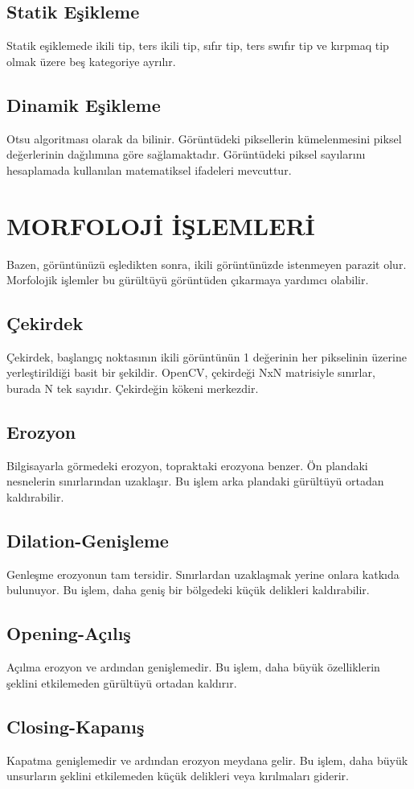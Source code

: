 \subsection{Statik Eşikleme}
Statik eşiklemede ikili tip, ters ikili tip, sıfır tip, ters swıfır tip ve kırpmaq tip olmak üzere beş kategoriye ayrılır.
\subsection{Dinamik Eşikleme}
Otsu algoritması olarak da bilinir. Görüntüdeki piksellerin kümelenmesini piksel değerlerinin dağılımına göre sağlamaktadır. Görüntüdeki piksel sayılarını hesaplamada kullanılan matematiksel ifadeleri mevcuttur.

 \section{MORFOLOJİ İŞLEMLERİ}
\cite{image_proc} Bazen, görüntünüzü eşledikten sonra, ikili görüntünüzde istenmeyen parazit olur. Morfolojik işlemler bu gürültüyü görüntüden çıkarmaya yardımcı olabilir.
\subsection{Çekirdek}
Çekirdek, başlangıç noktasının ikili görüntünün 1 değerinin her pikselinin üzerine yerleştirildiği basit bir şekildir. OpenCV, çekirdeği NxN matrisiyle sınırlar, burada N tek sayıdır. Çekirdeğin kökeni merkezdir.
\subsection{Erozyon}
Bilgisayarla görmedeki erozyon, topraktaki erozyona benzer. Ön plandaki nesnelerin sınırlarından uzaklaşır. Bu işlem arka plandaki gürültüyü ortadan kaldırabilir.
\subsection{Dilation-Genişleme}
Genleşme erozyonun tam tersidir. Sınırlardan uzaklaşmak yerine onlara katkıda bulunuyor. Bu işlem, daha geniş bir bölgedeki küçük delikleri kaldırabilir.
\subsection{Opening-Açılış}
Açılma erozyon ve ardından genişlemedir. Bu işlem, daha büyük özelliklerin şeklini etkilemeden gürültüyü ortadan kaldırır.
\subsection{Closing-Kapanış}
Kapatma genişlemedir ve ardından erozyon meydana gelir. Bu işlem, daha büyük unsurların şeklini etkilemeden küçük delikleri veya kırılmaları giderir.

